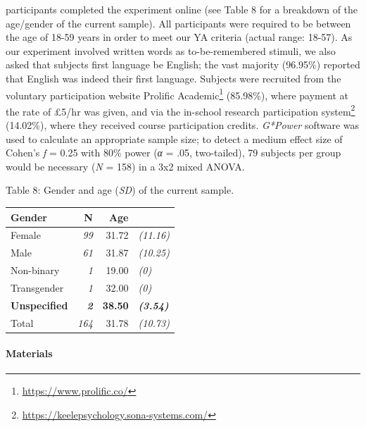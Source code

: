 \documentclass[
  11pt,
]{article}
\begin{document}
\hfill{} participants completed the experiment online (see Table
8 for a breakdown of the age/gender of the current sample). All
participants were required to be between the age of 18-59 years in order
to meet our YA criteria (actual range: 18-57). As our experiment
involved written words as to-be-remembered stimuli, we also asked that
subjects first language be English; the vast majority (96.95\%) reported
that English was indeed their first language. Subjects were recruited
from the voluntary participation website
Prolific Academic\footnote{\url{https://www.prolific.co/}} (85.98\%),
where payment at the rate of £5/hr was given, and via the in-school
research participation system\footnote{\url{https://keelepsychology.sona-systems.com/}}
(14.02\%), where they received course participation credits.
\emph{G*Power} software was used to calculate an appropriate sample
size; to detect a medium effect size of Cohen's \emph{f} = 0.25 with
80\% power (\emph{α} = .05, two-tailed), 79 subjects per group would be
necessary (\emph{N} = 158) in a 3x2 mixed ANOVA.

\newpage

Table 8: Gender and age (\emph{SD}) of the current sample.

\begin{table}[!h]
\centering
\begin{tabular}{l>{}rr>{}l}
\toprule
Gender & N & Age &  \\
\midrule
Female & \em{99} & 31.72 & \em{(11.16)}\\
Male & \em{61} & 31.87 & \em{(10.25)}\\
Non-binary & \em{1} & 19.00 & \em{(0)}\\
Transgender & \em{1} & 32.00 & \em{(0)}\\
\textbf{Unspecified} & \textbf{\em{2}} & \textbf{38.50} & \textbf{\em{(3.54)}}\\
\addlinespace
Total & \em{164} & 31.78 & \em{(10.73)}\\
\bottomrule
\end{tabular}
\end{table}

\hypertarget{materials-3}{%
\paragraph{Materials}\label{materials-3}}
\end{document}
